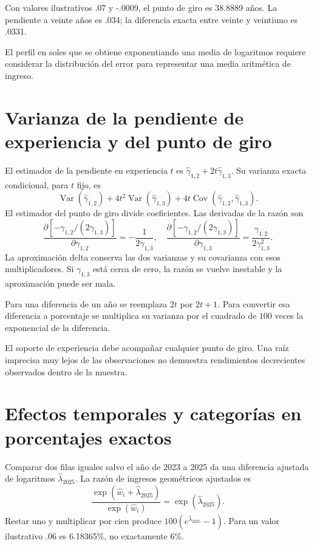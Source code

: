 \documentclass[11pt,a4paper]{article}
\DeclareMathOperator{\Var}{Var}
\DeclareMathOperator{\Cov}{Cov}
\begin{document}
Con valores ilustrativos .07 y -.0009, el punto de giro es 38.8889 años. La pendiente a veinte años es .034; la diferencia exacta entre veinte y veintiuno es .0331.

El perfil en soles que se obtiene exponentiando una media de logaritmos requiere considerar la distribución del error para representar una media aritmética de ingreso.

\clearpage
\section{Varianza de la pendiente de experiencia y del punto de giro}

El estimador de la pendiente en experiencia $t$ es
$\widehat\gamma_{1,2}+2t\widehat\gamma_{1,3}$. Su varianza exacta condicional, para $t$ fijo, es
\[
\Var(\widehat\gamma_{1,2})
+4t^2\Var(\widehat\gamma_{1,3})
+4t\Cov(\widehat\gamma_{1,2},\widehat\gamma_{1,3}).
\]
El estimador del punto de giro divide coeficientes. Las derivadas de la razón son
\[
\frac{\partial[-\gamma_{1,2}/(2\gamma_{1,3})]}
{\partial\gamma_{1,2}}=-\frac1{2\gamma_{1,3}},
\quad
\frac{\partial[-\gamma_{1,2}/(2\gamma_{1,3})]}
{\partial\gamma_{1,3}}
=\frac{\gamma_{1,2}}{2\gamma_{1,3}^2}.
\]
La aproximación delta conserva las dos varianzas y su covarianza con esos multiplicadores. Si $\gamma_{1,3}$ está cerca de cero, la razón se vuelve inestable y la aproximación puede ser mala.

Para una diferencia de un año se reemplaza $2t$ por $2t+1$. Para convertir esa diferencia a porcentaje se multiplica su varianza por el cuadrado de $100$ veces la exponencial de la diferencia.

El soporte de experiencia debe acompañar cualquier punto de giro. Una raíz imprecisa muy lejos de las observaciones no demuestra rendimientos decrecientes observados dentro de la muestra.

\clearpage
\section{Efectos temporales y categorías en porcentajes exactos}

Comparar dos filas iguales salvo el año de 2023 a 2025 da una diferencia ajustada de logaritmos $\widehat\lambda_{2025}$. La razón de ingresos geométricos ajustados es
\[
\frac{\exp(\widehat w_i+\widehat\lambda_{2025})}{\exp(\widehat w_i)}
=\exp(\widehat\lambda_{2025}).
\]
Restar uno y multiplicar por cien produce
$100(e^{\widehat\lambda_{2025}}-1)$. Para un valor ilustrativo .06 es 6.18365\%, no exactamente 6\%.
\end{document}

